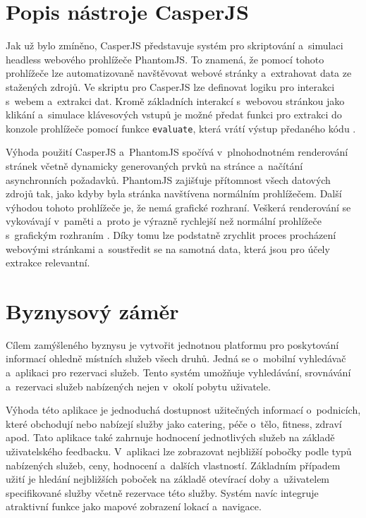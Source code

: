 \documentclass[11pt,a4paper]{article}
\begin{document}
\section{Popis nástroje CasperJS}
Jak už bylo zmíněno, CasperJS představuje systém pro skriptování a~simulaci headless webového prohlížeče PhantomJS. To znamená, že pomocí tohoto prohlížeče lze automatizovaně navštěvovat webové stránky a~extrahovat data ze stažených zdrojů. Ve skriptu pro CasperJS lze definovat logiku pro interakci s~webem a~extrakci dat. Kromě základních interakcí s~webovou stránkou jako klikání a~simulace klávesových vstupů je možné předat funkci pro extrakci do konzole prohlížeče pomocí funkce \texttt{evaluate}, která vrátí výstup předaného kódu \cite{hayton}.

Výhoda použití CasperJS a~PhantomJS spočívá v~plnohodnotném renderování stránek včetně dynamicky generovaných prvků na stránce a~načítání asynchronních požadavků. PhantomJS zajišťuje přítomnost všech datových zdrojů tak, jako kdyby byla stránka navštívena normálním prohlížečem. Další výhodou tohoto prohlížeče je, že nemá grafické rozhraní. Veškerá renderování se vykovávají v~paměti a~proto je výrazně rychlejší než normální prohlížeče s~grafickým rozhraním \cite{greco}. Díky tomu lze podstatně zrychlit proces procházení webovými stránkami a~soustředit se na samotná data, která jsou pro účely extrakce relevantní.


\section{Byznysový záměr}
Cílem zamýšleného byznysu je vytvořit jednotnou platformu pro poskytování informací ohledně místních služeb všech druhů. Jedná se o~mobilní vyhledávač a~aplikaci pro rezervaci služeb. Tento systém umožňuje vyhledávání, srovnávání a~rezervaci služeb nabízených  nejen v~okolí pobytu uživatele. 

Výhoda této aplikace je jednoduchá dostupnost užitečných informací o~podnicích, které obchodují nebo nabízejí služby jako catering, péče o~tělo, fitness, zdraví apod. Tato aplikace také zahrnuje hodnocení jednotlivých služeb na základě uživatelského feedbacku. V~aplikaci lze zobrazovat nejbližší pobočky podle typů nabízených služeb, ceny, hodnocení a~dalších vlastností. Základním případem užití je hledání nejbližších poboček na základě otevírací doby a~uživatelem specifikované služby včetně rezervace této služby. Systém navíc integruje atraktivní funkce jako mapové zobrazení lokací a~navigace.
\end{document}
